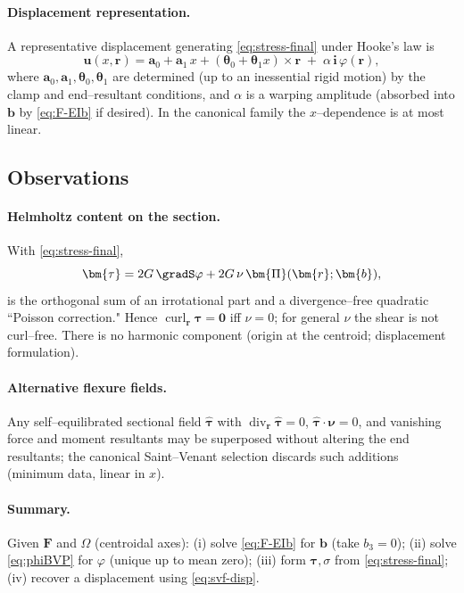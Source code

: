 \paragraph{Displacement representation.}
A representative displacement generating \eqref{eq:stress-final} under Hooke’s law is
\begin{equation}
\bm{u}(x,\bm{r})=\bm{a}_0+\bm{a}_1\,x+(\bm{\theta}_0+\bm{\theta}_1 x)\times \bm{r}\;+\;\alpha\,\mathbf{i}\,\varphi(\bm{r}),
\label{eq:svf-disp}
\end{equation}
where $\bm{a}_0,\bm{a}_1,\bm{\theta}_0,\bm{\theta}_1$ are determined (up to an inessential rigid motion) by the clamp and end–resultant conditions, and $\alpha$ is a warping amplitude (absorbed into $\bm{b}$ by \eqref{eq:F-EIb} if desired). In the canonical family the $x$–dependence is at most linear.

\subsection*{Observations}

\paragraph{Helmholtz content on the section.}
With \eqref{eq:stress-final},
\[
\bm{\tau} = 2G\,\gradS \varphi + 2G\,\nu\,\bm{\Pi}(\bm{r};\bm{b}),
\]
is the orthogonal sum of an irrotational part and a divergence–free quadratic ``Poisson correction." Hence $\operatorname{curl}_{\!\bm{r}}\bm{\tau}=\mathbf{0}$ iff $\nu=0$; for general $\nu$ the shear is not curl–free. There is no harmonic component (origin at the centroid; displacement formulation).

\paragraph{Alternative flexure fields.}
Any self–equilibrated sectional field $\widehat{\bm{\tau}}$ with
$\operatorname{div}_{\!\bm{r}}\widehat{\bm{\tau}}=0$, $\widehat{\bm{\tau}}\cdot\bm{\nu}=0$, and vanishing force and moment resultants may be superposed without altering the end resultants; the canonical Saint–Venant selection discards such additions (minimum data, linear in $x$).

\paragraph{Summary.}
Given $\bm{F}$ and $\Omega$ (centroidal axes):
(i) solve \eqref{eq:F-EIb} for $\bm{b}$ (take $b_3=0$);
(ii) solve \eqref{eq:phiBVP} for $\varphi$ (unique up to mean zero);
(iii) form $\bm{\tau},\sigma$ from \eqref{eq:stress-final};
(iv) recover a displacement using \eqref{eq:svf-disp}.

